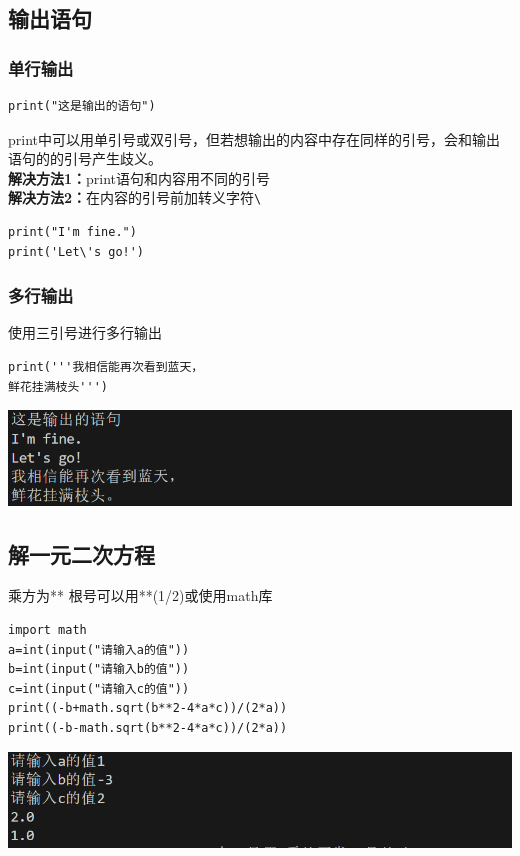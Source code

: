 \documentclass[UTF8,a4paper]{ctexart}
\begin{document}
\subsection{输出语句}
\subsubsection{单行输出}
\begin{lstlisting}
print("这是输出的语句")
\end{lstlisting}
print中可以用单引号或双引号，但若想输出的内容中存在同样的引号，会和输出语句的的引号产生歧义。\\
\textbf{解决方法1：}print语句和内容用不同的引号\\
\textbf{解决方法2：}在内容的引号前加转义字符\verb|\|
\begin{lstlisting}
print("I'm fine.")
print('Let\'s go!')
\end{lstlisting}
\subsubsection{多行输出}
使用三引号进行多行输出
\begin{lstlisting}
print('''我相信能再次看到蓝天，
鲜花挂满枝头''')
\end{lstlisting}
\includegraphics[width=1\textwidth]{./python/print1.png}

\subsection{解一元二次方程}
乘方为**  根号可以用**(1/2)或使用math库
\begin{lstlisting}
import math
a=int(input("请输入a的值"))
b=int(input("请输入b的值"))
c=int(input("请输入c的值"))
print((-b+math.sqrt(b**2-4*a*c))/(2*a))
print((-b-math.sqrt(b**2-4*a*c))/(2*a))
\end{lstlisting}
\includegraphics[width=1\textwidth]{./python/math.png}
\end{document}
